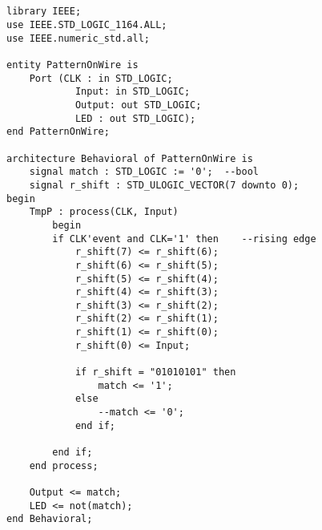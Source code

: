\appendix

\begin{appendices}

\section{}

\begin{lstlisting}[style=code]
library IEEE;
use IEEE.STD_LOGIC_1164.ALL;
use IEEE.numeric_std.all;

entity PatternOnWire is
	Port (CLK : in STD_LOGIC;
			Input: in STD_LOGIC;
			Output: out STD_LOGIC;
			LED : out STD_LOGIC);
end PatternOnWire;

architecture Behavioral of PatternOnWire is
	signal match : STD_LOGIC := '0';  --bool
	signal r_shift : STD_ULOGIC_VECTOR(7 downto 0);
begin	
	TmpP : process(CLK, Input)
		begin
		if CLK'event and CLK='1' then	 --rising edge
			r_shift(7) <= r_shift(6);
			r_shift(6) <= r_shift(5);
			r_shift(5) <= r_shift(4);
			r_shift(4) <= r_shift(3);
			r_shift(3) <= r_shift(2);
			r_shift(2) <= r_shift(1);
			r_shift(1) <= r_shift(0);
			r_shift(0) <= Input;
			
			if r_shift = "01010101" then
				match <= '1';
			else
				--match <= '0';
			end if;
			
		end if;
	end process;

	Output <= match;
	LED <= not(match);
end Behavioral;

\end{lstlisting}

\end{appendices}
